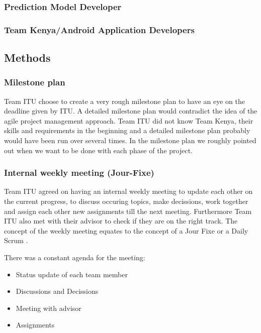 \subsubsection{Prediction Model Developer}

\subsubsection{Team Kenya/Android Application Developers}


\subsection{Methods}

\subsubsection{Milestone plan}
Team ITU choose to create a very rough milestone plan to have an eye on the deadline given by ITU. A detailed milestone plan would contradict the idea of the agile project management approach. Team ITU did not know Team Kenya, their skills and requirements in the beginning and a detailed milestone plan probably would have been run over several times. In the milestone plan we roughly pointed out when we want to be done with each phase of the project.


\subsubsection{Internal weekly meeting (Jour-Fixe)}
Team ITU agreed on having an internal weekly meeting to update each other on the current progress, to discuss occuring topics, make decissions, work together and assign each other new assignments till the next meeting. Furthermore Team ITU also met with their advisor to check if they are on the right track. The concept of the weekly meeting equates to the concept of a Jour Fixe  or a Daily Scrum .

There was a constant agenda for the meeting:

\begin{itemize}
	\item Status update of each team member
	\item Discussions and Decissions
	\item Meeting with advisor	
	\item Assignments
\end{itemize}

